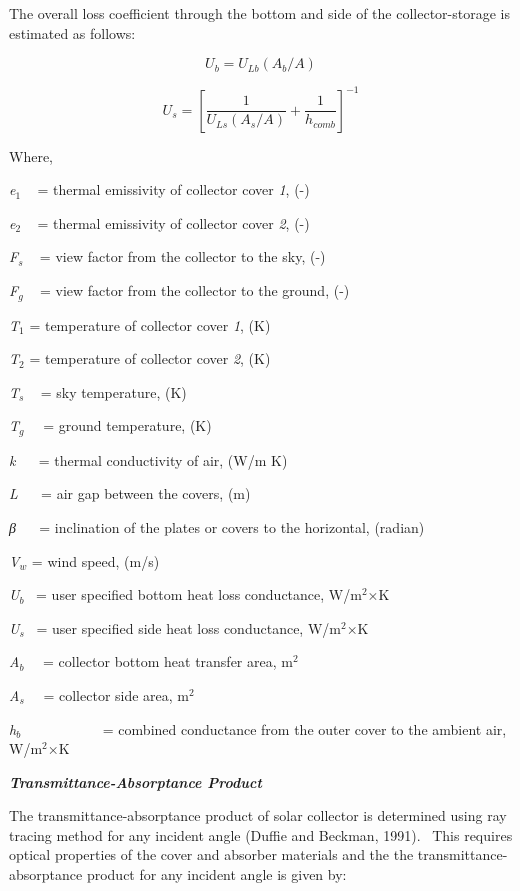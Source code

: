The overall loss coefficient through the bottom and side of the collector-storage is estimated as follows:

\begin{equation}
{U_b} = {U_{Lb}}\left( {{A_b}/A} \right)
\end{equation}

\begin{equation}
{U_s} = {\left[ {\frac{1}{{{U_{Ls}}\left( {{A_s}/A} \right)}} + \frac{1}{{{h_{comb}}}}} \right]^{ - 1}}
\end{equation}

Where,

\emph{e\(_{1}\)} ~ = thermal emissivity of collector cover \emph{1}, (-)

\emph{e\(_{2}\)} ~ = thermal emissivity of collector cover \emph{2}, (-)

\emph{F\(_{s}\)} ~ = view factor from the collector to the sky, (-)

\emph{F\(_{g}\)} ~ = view factor from the collector to the ground, (-)

\emph{T\(_{1}\)} = temperature of collector cover \emph{1}, (K)

\emph{T\(_{2}\)} = temperature of collector cover \emph{2}, (K)

\emph{T\(_{s}\)} ~ = sky temperature, (K)

\emph{T\(_{g}\)}~~ = ground temperature, (K)

\emph{k} ~~ = thermal conductivity of air, (W/m K)

\emph{L} ~~ = air gap between the covers, (m)

\emph{β} ~~ = inclination of the plates or covers to the horizontal, (radian)

\emph{V\(_{w}\)} = wind speed, (m/s)

\emph{U\(_{b}\)}~ = user specified bottom heat loss conductance, W/m\(^{2}\)×K

\emph{U\(_{s}\)}~ = user specified side heat loss conductance, W/m\(^{2}\)×K

\emph{A\(_{b}\)}~~ = collector bottom heat transfer area, m\(^{2}\)

\emph{A\(_{s}\)}~~ = collector side area, m\(^{2}\)

\emph{h\(_{b}\)}~~~~~~~~~~~ = combined conductance from the outer cover to the ambient air, W/m\(^{2}\)×K

\textbf{\emph{Transmittance-Absorptance Product}}

The transmittance-absorptance product of solar collector is determined using ray tracing method for any incident angle (Duffie and Beckman, 1991).~ This requires optical properties of the cover and absorber materials and the the transmittance-absorptance product for any incident angle is given by:

